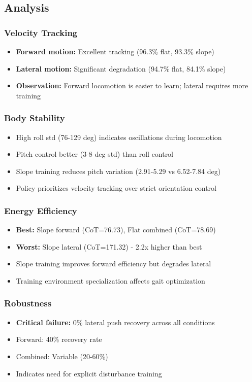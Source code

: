 \documentclass[12pt,a4paper]{article}
\begin{document}
\subsection{Analysis}

\subsubsection{Velocity Tracking}
\begin{itemize}
    \item \textbf{Forward motion:} Excellent tracking (96.3\% flat, 93.3\% slope)
    \item \textbf{Lateral motion:} Significant degradation (94.7\% flat, 84.1\% slope)
    \item \textbf{Observation:} Forward locomotion is easier to learn; lateral requires more training
\end{itemize}

\subsubsection{Body Stability}
\begin{itemize}
    \item High roll std (76-129 deg) indicates oscillations during locomotion
    \item Pitch control better (3-8 deg std) than roll control
    \item Slope training reduces pitch variation (2.91-5.29 vs 6.52-7.84 deg)
    \item Policy prioritizes velocity tracking over strict orientation control
\end{itemize}

\subsubsection{Energy Efficiency}
\begin{itemize}
    \item \textbf{Best:} Slope forward (CoT=76.73), Flat combined (CoT=78.69)
    \item \textbf{Worst:} Slope lateral (CoT=171.32) - 2.2x higher than best
    \item Slope training improves forward efficiency but degrades lateral
    \item Training environment specialization affects gait optimization
\end{itemize}

\subsubsection{Robustness}
\begin{itemize}
    \item \textbf{Critical failure:} 0\% lateral push recovery across all conditions
    \item Forward: 40\% recovery rate
    \item Combined: Variable (20-60\%)
    \item Indicates need for explicit disturbance training
\end{itemize}
\end{document}
